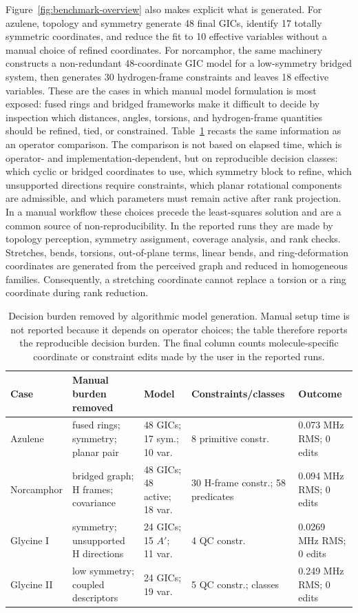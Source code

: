 \documentclass[aip,jcp,reprint,longbibliography,floatfix]{revtex4-2}
\begin{document}
Figure~\ref{fig:benchmark-overview} also makes explicit what is generated.
For azulene, topology and symmetry generate 48 final GICs, identify 17
totally symmetric coordinates, and reduce the fit to 10 effective variables
without a manual choice of refined coordinates. For norcamphor, the same
machinery constructs a non-redundant 48-coordinate GIC model for a
low-symmetry bridged system, then generates 30 hydrogen-frame constraints and
leaves 18 effective variables. These are the cases in which manual model
formulation is most exposed: fused rings and bridged frameworks make it
difficult to decide by inspection which distances, angles, torsions, and
hydrogen-frame quantities should be refined, tied, or constrained.
Table~\ref{tab:manual-vs-morpheus} recasts the same information as an
operator comparison. The comparison is not based on elapsed time, which is
operator- and implementation-dependent, but on reproducible decision classes:
which cyclic or bridged coordinates to use, which symmetry block to refine,
which unsupported directions require constraints, which planar rotational
components are admissible, and which parameters must remain active after rank
projection. In a manual workflow these choices precede the least-squares
solution and are a common source of non-reproducibility. In the reported runs
they are made by topology perception, symmetry assignment, coverage analysis,
and rank checks. Stretches, bends, torsions, out-of-plane terms, linear bends,
and ring-deformation coordinates are generated from the perceived graph and
reduced in homogeneous families. Consequently, a stretching coordinate cannot
replace a torsion or a ring coordinate during rank reduction.

\begin{table}
\caption{Decision burden removed by algorithmic model generation. Manual setup time
is not reported because it depends on operator choices; the table therefore
reports the reproducible decision burden. The final column counts
molecule-specific coordinate or constraint edits made by the user in the
reported runs.}
\label{tab:manual-vs-morpheus}
\footnotesize
\setlength{\tabcolsep}{1.5pt}
\begin{tabular*}{\textwidth}{@{\extracolsep{\fill}}lllll@{}}
\toprule
Case & Manual burden removed & Model & Constraints/classes & Outcome \\
\midrule
Azulene &
fused rings; symmetry; planar pair &
48 GICs; 17 sym.; 10 var. &
8 primitive constr. &
0.073 MHz RMS; 0 edits \\
Norcamphor &
bridged graph; H frames; covariance &
48 GICs; 48 active; 18 var. &
30 H-frame constr.; 58 predicates &
0.094 MHz RMS; 0 edits \\
Glycine I &
symmetry; unsupported H directions &
24 GICs; 15 $A'$; 11 var. &
4 QC constr. &
0.0269 MHz RMS; 0 edits \\
Glycine II &
low symmetry; coupled descriptors &
24 GICs; 19 var. &
5 QC constr.; classes &
0.249 MHz RMS; 0 edits \\
\bottomrule
\end{tabular*}
\end{table}
\end{document}

